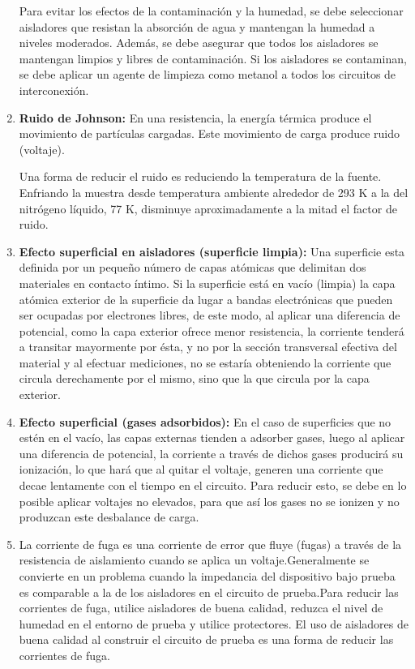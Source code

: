 \begin{enumerate}
    Para evitar los efectos de la contaminación y la humedad, se debe seleccionar aisladores que resistan la absorción de agua y mantengan la humedad a niveles moderados. Además, se debe asegurar que todos los aisladores se mantengan limpios y libres de contaminación. Si los aisladores se contaminan, se debe aplicar un agente de limpieza como metanol a todos los circuitos de interconexión.


    
    \item %
    \textbf{Ruido de Johnson:} En una resistencia, la energía térmica produce el movimiento de partículas cargadas. Este movimiento de carga produce ruido (voltaje).
    
    Una forma de reducir el ruido es reduciendo la temperatura de la fuente. Enfriando la muestra desde temperatura ambiente alrededor de 293 K a la del nitrógeno líquido, 77 K, disminuye aproximadamente a la mitad el factor de ruido.
    \item %
    \textbf{Efecto superficial en aisladores (superficie limpia):} Una superficie esta definida por un pequeño número de capas atómicas que delimitan dos materiales en contacto íntimo. Si la superficie está en vacío (limpia) la capa atómica exterior de la superficie da lugar a bandas electrónicas que pueden ser ocupadas por electrones libres, de este modo, al aplicar una diferencia de potencial, como la capa exterior ofrece menor resistencia, la corriente tenderá a transitar mayormente por ésta, y no por la sección transversal efectiva del material y al efectuar mediciones, no se estaría obteniendo la corriente que circula derechamente por el mismo, sino que la que circula por la capa exterior.
    \item %
    \textbf{Efecto superficial (gases adsorbidos):} En el caso de superficies que no estén en el vacío, las capas externas tienden a adsorber gases, luego al aplicar una diferencia de potencial, la corriente a través de dichos gases producirá su ionización, lo que hará que al quitar el voltaje, generen una corriente que decae lentamente con el tiempo en el circuito. Para reducir esto, se debe en lo posible aplicar voltajes no elevados, para que así los gases no se ionizen y no produzcan este desbalance de carga.

    
    \item %
     La corriente de fuga es una corriente de error que fluye (fugas) a través de la resistencia de aislamiento cuando se aplica un voltaje.Generalmente se convierte en un problema cuando la impedancia del dispositivo bajo prueba es comparable a la de los aisladores en el circuito de prueba.Para reducir las corrientes de fuga, utilice aisladores de buena calidad, reduzca el nivel de humedad en el entorno de prueba y utilice protectores. El uso de aisladores de buena calidad al construir el circuito de prueba es una forma de reducir las corrientes de fuga.
     

\end{enumerate}
